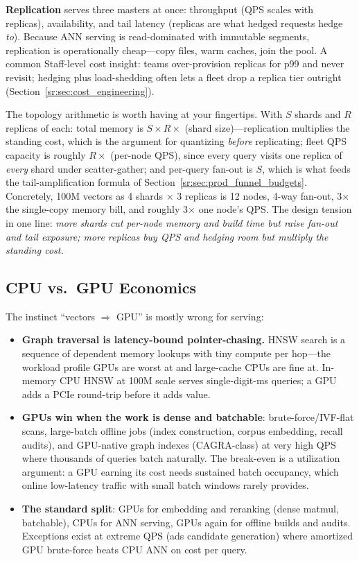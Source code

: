 \textbf{Replication} serves three masters at once: throughput (QPS scales with replicas), availability, and tail latency (replicas are what hedged requests hedge \textit{to}). Because ANN serving is read-dominated with immutable segments, replication is operationally cheap---copy files, warm caches, join the pool. A common Staff-level cost insight: teams over-provision replicas for p99 and never revisit; hedging plus load-shedding often lets a fleet drop a replica tier outright (Section~\ref{sr:sec:cost_engineering}).

The topology arithmetic is worth having at your fingertips. With $S$ shards and $R$ replicas of each: total memory is $S \times R \times$ (shard size)---replication multiplies the standing cost, which is the argument for quantizing \textit{before} replicating; fleet QPS capacity is roughly $R \times$ (per-node QPS), since every query visits one replica of \textit{every} shard under scatter-gather; and per-query fan-out is $S$, which is what feeds the tail-amplification formula of Section~\ref{sr:sec:prod_funnel_budgets}. Concretely, 100M vectors as 4 shards $\times$ 3 replicas is 12 nodes, 4-way fan-out, 3$\times$ the single-copy memory bill, and roughly 3$\times$ one node's QPS. The design tension in one line: \textit{more shards cut per-node memory and build time but raise fan-out and tail exposure; more replicas buy QPS and hedging room but multiply the standing cost.}

\subsection{CPU vs.\ GPU Economics}

The instinct ``vectors $\Rightarrow$ GPU'' is mostly wrong for serving:

\begin{itemize}
    \item \textbf{Graph traversal is latency-bound pointer-chasing.} HNSW search is a sequence of dependent memory lookups with tiny compute per hop---the workload profile GPUs are worst at and large-cache CPUs are fine at. In-memory CPU HNSW at 100M scale serves single-digit-ms queries; a GPU adds a PCIe round-trip before it adds value.
    \item \textbf{GPUs win when the work is dense and batchable}: brute-force/IVF-flat scans, large-batch offline jobs (index construction, corpus embedding, recall audits), and GPU-native graph indexes (CAGRA-class) at very high QPS where thousands of queries batch naturally. The break-even is a utilization argument: a GPU earning its cost needs sustained batch occupancy, which online low-latency traffic with small batch windows rarely provides.
    \item \textbf{The standard split}: GPUs for embedding and reranking (dense matmul, batchable), CPUs for ANN serving, GPUs again for offline builds and audits. Exceptions exist at extreme QPS (ads candidate generation) where amortized GPU brute-force beats CPU ANN on cost per query.
\end{itemize}

